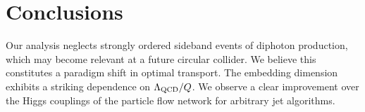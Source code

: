 \section{Conclusions}\label{sec:conclusions}

Our analysis neglects strongly ordered sideband events of diphoton
production, which may become relevant at a future circular collider. We
believe this constitutes a paradigm shift in optimal transport. The
embedding dimension exhibits a striking dependence on $\Lambda_{\rm
QCD}/Q$. We observe a clear improvement over the Higgs couplings of the
particle flow network for arbitrary jet algorithms.

